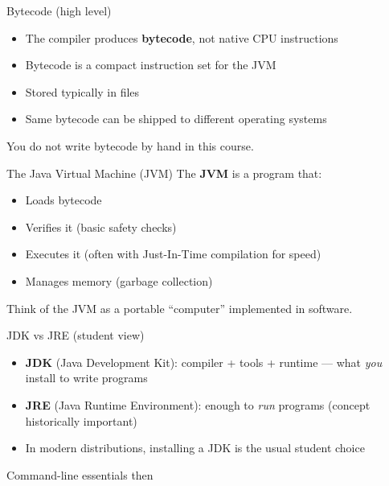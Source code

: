 \documentclass[aspectratio=169,11pt]{beamer}
\begin{document}
    \begin{frame}{Bytecode (high level)}
        \begin{itemize}
            \item The compiler produces \textbf{bytecode}, not native CPU instructions
            \item Bytecode is a compact instruction set for the JVM
            \item Stored typically in  files
            \item Same bytecode can be shipped to different operating systems
        \end{itemize}
        \vspace{0.5em}
        You do not write bytecode by hand in this course.
    \end{frame}

    \begin{frame}{The Java Virtual Machine (JVM)}
        The \textbf{JVM} is a program that:
        \begin{itemize}
            \item Loads bytecode
            \item Verifies it (basic safety checks)
            \item Executes it (often with Just-In-Time compilation for speed)
            \item Manages memory (garbage collection)
        \end{itemize}
        \vspace{0.5em}
        Think of the JVM as a portable ``computer'' implemented in software.
    \end{frame}

    \begin{frame}{JDK vs JRE (student view)}
        \begin{itemize}
            \item \textbf{JDK} (Java Development Kit): compiler + tools + runtime --- what \emph{you} install to write programs
            \item \textbf{JRE} (Java Runtime Environment): enough to \emph{run} programs (concept historically important)
            \item In modern distributions, installing a JDK is the usual student choice
        \end{itemize}
        \vspace{0.5em}
        \begin{block}{Command-line essentials}
             \quad then \quad {}
        \end{block}
    \end{frame}
\end{document}
